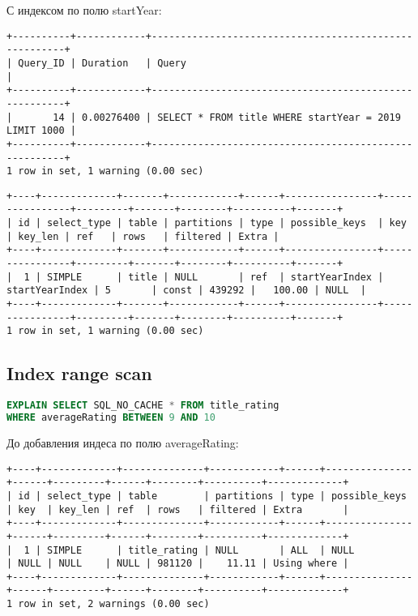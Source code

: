 \documentclass[12pt,a4paper]{article}
\begin{document}
С индексом по полю startYear:
\begin{lstlisting}[basicstyle = \tiny\ttfamily, columns = fixed]
+----------+------------+-------------------------------------------------------+
| Query_ID | Duration   | Query                                                 |
+----------+------------+-------------------------------------------------------+
|       14 | 0.00276400 | SELECT * FROM title WHERE startYear = 2019 LIMIT 1000 |
+----------+------------+-------------------------------------------------------+
1 row in set, 1 warning (0.00 sec)
\end{lstlisting}
\begin{lstlisting}[basicstyle = \tiny\ttfamily, columns = fixed]
+----+-------------+-------+------------+------+----------------+----------------+---------+-------+--------+----------+-------+
| id | select_type | table | partitions | type | possible_keys  | key            | key_len | ref   | rows   | filtered | Extra |
+----+-------------+-------+------------+------+----------------+----------------+---------+-------+--------+----------+-------+
|  1 | SIMPLE      | title | NULL       | ref  | startYearIndex | startYearIndex | 5       | const | 439292 |   100.00 | NULL  |
+----+-------------+-------+------------+------+----------------+----------------+---------+-------+--------+----------+-------+
1 row in set, 1 warning (0.00 sec)
\end{lstlisting}
\subsection{Index range scan}

\begin{lstlisting}[language=SQL]
EXPLAIN SELECT SQL_NO_CACHE * FROM title_rating
WHERE averageRating BETWEEN 9 AND 10
\end{lstlisting}

До добавления индеса по полю averageRating:

\begin{lstlisting}[basicstyle = \tiny\ttfamily, columns = fixed]
+----+-------------+--------------+------------+------+---------------+------+---------+------+--------+----------+-------------+
| id | select_type | table        | partitions | type | possible_keys | key  | key_len | ref  | rows   | filtered | Extra       |
+----+-------------+--------------+------------+------+---------------+------+---------+------+--------+----------+-------------+
|  1 | SIMPLE      | title_rating | NULL       | ALL  | NULL          | NULL | NULL    | NULL | 981120 |    11.11 | Using where |
+----+-------------+--------------+------------+------+---------------+------+---------+------+--------+----------+-------------+
1 row in set, 2 warnings (0.00 sec)
\end{lstlisting}
\end{document}
